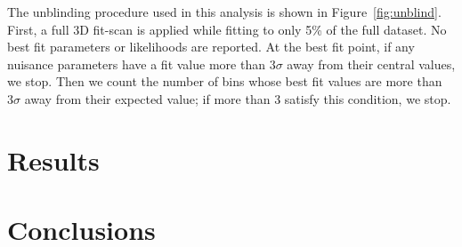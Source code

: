 \documentclass[main.tex]{subfiles}
\begin{document}
The unblinding procedure used in this analysis is shown in Figure~\ref{fig:unblind}. 
First, a full 3D fit-scan is applied while fitting to only 5\% of the full dataset. 
No best fit parameters or likelihoods are reported. 
At the best fit point, if any nuisance parameters have a fit value more than $3\sigma$ away from their central values, we stop. 
Then we count the number of bins whose best fit values are more than $3\sigma$ away from their expected value; if more than 3 satisfy this condition, we stop. 


\section{Results}

\section{Conclusions}
\end{document}
